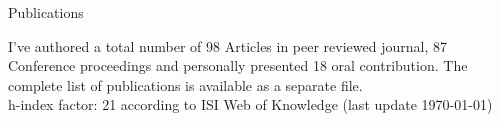 \begin{cvblock}{Publications}
\end{cvblock}
I've authored a total number of 98 Articles in peer reviewed journal,
87 Conference proceedings and personally presented 18 oral
contribution. The complete list of publications is available as a
separate file. \\
h-index factor: 21 according to ISI Web of Knowledge (last update \today)

